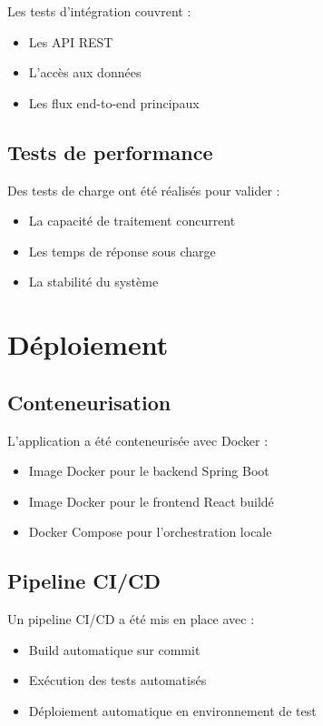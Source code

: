 \documentclass[12pt,a4paper]{report}
\begin{document}
Les tests d'intégration couvrent :

\begin{itemize}
    \item Les API REST
    \item L'accès aux données
    \item Les flux end-to-end principaux
\end{itemize}

\subsection{Tests de performance}

Des tests de charge ont été réalisés pour valider :

\begin{itemize}
    \item La capacité de traitement concurrent
    \item Les temps de réponse sous charge
    \item La stabilité du système
\end{itemize}

\section{Déploiement}

\subsection{Conteneurisation}

L'application a été conteneurisée avec Docker :

\begin{itemize}
    \item Image Docker pour le backend Spring Boot
    \item Image Docker pour le frontend React buildé
    \item Docker Compose pour l'orchestration locale
\end{itemize}

\subsection{Pipeline CI/CD}

Un pipeline CI/CD a été mis en place avec :

\begin{itemize}
    \item Build automatique sur commit
    \item Exécution des tests automatisés
    \item Déploiement automatique en environnement de test
\end{itemize}
\end{document}
